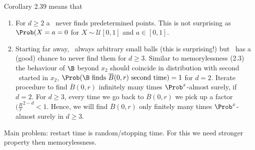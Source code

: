 \begin{bem}
Corollary 2.39 means that
\begin{enumerate}[label=\alph*)]
\item For $d\geq 2$ a \BMd\ never finds predetermined points.
This is not surprising as $\Prob(X=a=0$ for $X \sim \mathcal{U}[0,1]$ 
and $a \in [0,1]$.
\item Starting far away, \BMd\ always arbitrary small balls (this is surprising!)
but \BMd\ has a (good) chance to never find them for $d \geq 3$.
Similar to  memorylessness (2.3) the behaviour of $\B$ beyond $x_2$
should coincide in distribution with second \BMd\ started in $x_2$,
\ie $\Prob(\B \text{ finds } \overline{B}(0,r) \text{ second time})=1$ for $d=2$.
Iterate procedure to find $\overline{B}(0,r)$ infinitely many times $\Prob^x$-almost surely, if $d=2$.
For $d \geq 3$, every time we go back to $\overline{B}(0,r)$ we pick
up a factor $(\frac{R}{r}^{2-d}<1$.
Hence, we will find $\overline{B}(0,r)$ only finitely many times $\Prob^x$-almost surely in $d \geq 3$.
\end{enumerate}
\end{bem}

Main problem: restart time is random/stopping time. For this we need stronger property then memorylessness.